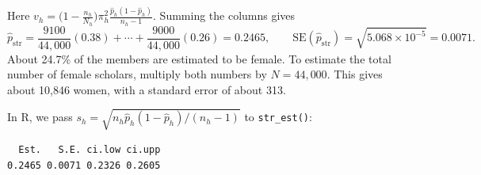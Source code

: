 \documentclass[
  letterpaper,
  DIV=11,
  numbers=noendperiod]{scrreprt}
\newenvironment{Shaded}{\begin{snugshade}}{\end{snugshade}}
\newcommand{\AttributeTok}[1]{\textcolor[rgb]{0.40,0.45,0.13}{#1}}
\newcommand{\ConstantTok}[1]{\textcolor[rgb]{0.56,0.35,0.01}{#1}}
\newcommand{\DecValTok}[1]{\textcolor[rgb]{0.68,0.00,0.00}{#1}}
\newcommand{\FloatTok}[1]{\textcolor[rgb]{0.68,0.00,0.00}{#1}}
\newcommand{\FunctionTok}[1]{\textcolor[rgb]{0.28,0.35,0.67}{#1}}
\newcommand{\NormalTok}[1]{\textcolor[rgb]{0.00,0.23,0.31}{#1}}
\newcommand{\OtherTok}[1]{\textcolor[rgb]{0.00,0.23,0.31}{#1}}
\newcommand{\SpecialCharTok}[1]{\textcolor[rgb]{0.37,0.37,0.37}{#1}}
\newcommand{\StringTok}[1]{\textcolor[rgb]{0.13,0.47,0.30}{#1}}
\renewcommand{\[}{\begin{equation}}
\renewcommand{\]}{\end{equation}}
\begin{document}
Here
\(v_h = \big(1-\tfrac{n_h}{N_h}\big)\pi_h^2\tfrac{\hat p_h(1-\hat p_h)}{n_h-1}\).
Summing the columns gives \[
\hat p_{\text{str}} = \frac{9100}{44{,}000}(0.38) + \cdots + \frac{9000}{44{,}000}(0.26) = 0.2465,
\qquad
\mathrm{SE}(\hat p_{\text{str}}) = \sqrt{5.068\times10^{-5}} = 0.0071 .
\] About 24.7\% of the members are estimated to be female. To estimate
the total number of female scholars, multiply both numbers by
\(N = 44{,}000\). This gives about 10,846 women, with a standard error
of about 313.

In R, we pass \(s_h = \sqrt{n_h\hat p_h(1-\hat p_h)/(n_h-1)}\) to
\texttt{str\_est()}:

\begin{Shaded}
\end{Shaded}

\begin{verbatim}
  Est.   S.E. ci.low ci.upp 
0.2465 0.0071 0.2326 0.2605 
\end{verbatim}
\end{document}
